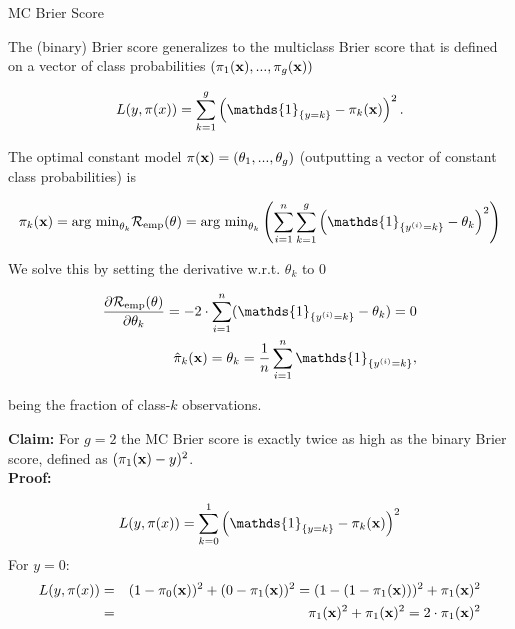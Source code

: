 \documentclass[11pt,compress,t,notes=noshow, xcolor=table]{beamer}
\begin{document}
\begin{vbframe}{MC Brier Score}

The (binary) Brier score generalizes to the multiclass Brier score that is defined on a vector of class probabilities $\left(\pi_1(\mathbf{x}), ..., \pi_g(\mathbf{x})\right)$

\begin{footnotesize}
$$
  L(y, \pi(x)) = \sum_{k = 1}^g \left(\mathds{1}_{\{y = k\}} - \pi_k(\xv)\right)^2.
$$
\end{footnotesize}

The optimal constant model $\pi(\mathbf{x}) = \left(\theta_1, ..., \theta_g\right)$ (outputting a vector of constant class probabilities) is  

\vspace*{-0.5cm}
\begin{footnotesize}
  \begin{eqnarray*}
    \pikx =\text{arg min}_{\theta_k} \riske(\theta) = \text{arg min}_{\theta_k} \left(\sumin \sum_{k = 1}^g \left(\mathds{1}_{\{\yi = k\}} - \theta_k\right)^2\right) 
      \end{eqnarray*}
      \end{footnotesize}
        We solve this by setting the derivative w.r.t. $\theta_k$ to 0
        \begin{footnotesize}
      \begin{eqnarray*}
      \frac{\partial \riske(\theta)}{\partial \theta_k} = - 2 \cdot \sumin (\mathds{1}_{\{\yi = k\}} - \theta_k) = 0 \\
    \pikxh = \theta_k = \frac{1}{n} \sumin \mathds{1}_{\{\yi = k\}},   
    \end{eqnarray*}
\end{footnotesize}
being the fraction of class-$k$ observations. 

\framebreak

\textbf{Claim:} For $g = 2$ the MC Brier score is exactly twice as high as the binary Brier score, defined as $(\pi_1(\mathbf{x}) - y)^2$. \\
\lz
\textbf{Proof:}
\begin{footnotesize}
$$
  L(y, \pi(x)) = \sum_{k = 0}^1 \left(\mathds{1}_{\{y = k\}} - \pi_k(\xv)\right)^2
  $$
  For $y = 0$:
  \begin{eqnarray*}
  L(y, \pi(x)) &=& (1-\pi_0(\mathbf{x}))^2 + (0 - \pi_1(\mathbf{x}))^2  = (1-(1 - \pi_1(\mathbf{x})))^2 + \pi_1(\mathbf{x})^2 \\
  &=& \pi_1(\mathbf{x})^2 + \pi_1(\mathbf{x})^2 = 2 \cdot \pi_1(\mathbf{x})^2
  \end{eqnarray*}


\end{footnotesize}
\end{vbframe}
\end{document}
